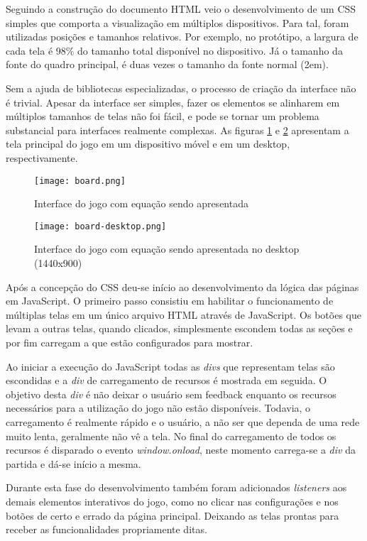 Seguindo a construção do documento HTML veio o desenvolvimento de um
CSS simples que comporta a visualização em múltiplos dispositivos.
Para tal, foram utilizadas posições e tamanhos relativos. Por
exemplo, no protótipo, a largura de cada tela é 98\% do tamanho total disponível no
dispositivo. Já o tamanho da fonte do quadro principal, é duas vezes o
tamanho da fonte normal (2em).

Sem a ajuda de bibliotecas especializadas, o processo de criação da
interface não é trivial. Apesar da interface ser simples, fazer os elementos
se alinharem em múltiplos tamanhos de telas não foi fácil, e pode se
tornar um problema substancial para interfaces realmente complexas.
As figuras \ref{fig:gameScreen} e \ref{fig:gameScreenDesktop} apresentam
a tela principal do jogo em um dispositivo móvel e em um desktop, respectivamente.

\begin{figure}[H]
    \centering
    \texttt{[image: board.png]}
	\caption{Interface do jogo com equação sendo apresentada}
    \label{fig:gameScreen}
\end{figure}


\begin{figure}[H]
    \centering
    \texttt{[image: board-desktop.png]}
    \caption{Interface do jogo com equação sendo apresentada no desktop (1440x900)}
    \label{fig:gameScreenDesktop}
\end{figure}

Após a concepção do CSS deu-se início ao desenvolvimento da lógica
das páginas em JavaScript. O primeiro passo consistiu em habilitar o
funcionamento de múltiplas telas em um único arquivo HTML através
de JavaScript. Os botões que levam a outras telas, quando clicados,
simplesmente escondem todas as seções e por fim carregam a que estão
configurados para mostrar.

Ao iniciar a execução do JavaScript todas as \textit{divs} que
representam telas são escondidas e a \textit{div} de carregamento de
recursos é mostrada em seguida. O objetivo desta \textit{div} é não deixar
o usuário sem feedback enquanto os recursos necessários para a
utilização do jogo não estão disponíveis. Todavia, o carregamento
é realmente rápido e o usuário, a não ser que dependa de uma rede
muito lenta, geralmente não vê a tela. No final do carregamento
de todos os recursos é disparado o evento \textit{window.onload},
neste momento carrega-se a \textit{div} da partida e dá-se início a mesma.

Durante esta fase do desenvolvimento também foram adicionados
\textit{listeners} aos demais elementos interativos do jogo, como no
clicar nas configurações e nos botões de certo e errado da página
principal. Deixando as telas prontas para receber as funcionalidades
propriamente ditas.

